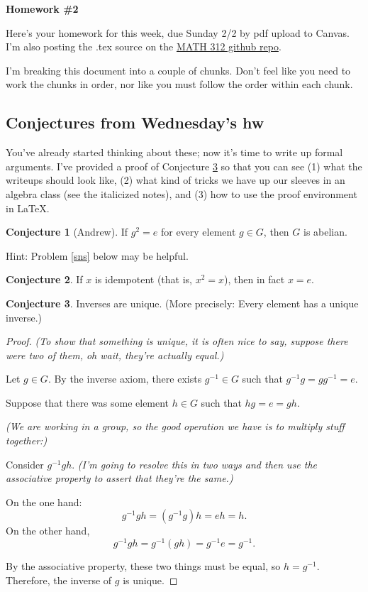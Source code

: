 \documentclass[12pt]{article}
\theoremstyle{definition} %
\newtheorem{conjecture}{Conjecture}
\newcommand\inv{^{-1}} %
\renewcommand{\section}[1]{\begin{center} \textbf{#1} \\\end{center}}
\begin{document}
\section{Homework \#2} %

Here's your homework for this week, due Sunday 2/2 by pdf upload to Canvas. I'm also posting the .tex source on the \href{https://github.com/rhinopotamus/math312}{MATH 312 github repo}.

I'm breaking this document into a couple of chunks. Don't feel like you need to work the chunks in order, nor like you must follow the order within each chunk.

\subsection*{Conjectures from Wednesday's hw}

You've already started thinking about these; now it's time to write up formal arguments. I've provided a proof of Conjecture \ref{inv-unique} so that you can see (1) what the writeups should look like, (2) what kind of tricks we have up our sleeves in an algebra class (see the italicized notes), and (3) how to use the proof environment in LaTeX.

\begin{conjecture}[Andrew]
If $g^2 = e$ for every element $g\in G$, then $G$ is abelian.
\end{conjecture}
Hint: Problem \ref{sns} below may be helpful.

\begin{conjecture}
    If $x$ is idempotent (that is, $x^2 = x$), then in fact $x = e$.
\end{conjecture}

\begin{conjecture}
    \label{inv-unique}
    Inverses are unique. (More precisely: Every element has a unique inverse.)
\end{conjecture}
\begin{proof}
    \textit{(To show that something is unique, it is often nice to say, suppose there were two of them, oh wait, they're actually equal.)}

    Let $g\in G$. By the inverse axiom, there exists $g\inv \in G$ such that $g\inv g = g g\inv = e$.

    Suppose that there was some element $h\in G$ such that $h g = e = gh$. 

    \textit{(We are working in a group, so the good operation we have is to multiply stuff together:)}

    Consider $g\inv g h$. \textit{(I'm going to resolve this in two ways and then use the associative property to assert that they're the same.)} 
    
    On the one hand: 
    \[g\inv g h = (g\inv g) h = eh = h.\]
    On the other hand, 
    \[g\inv g h = g\inv(gh) = g\inv e = g\inv.\] 
    
    By the associative property, these two things must be equal, so $h = g\inv$. Therefore, the inverse of $g$ is unique.
\end{proof}
\end{document}
